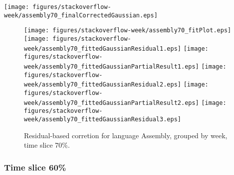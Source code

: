 \begin{center}
{\texttt{[image: figures/stackoverflow-week/assembly70\_finalCorrectedGaussian.eps]}}
\end{center}

\FloatBarrier

\begin{figure}[t]
\centering
{}
{\texttt{[image: figures/stackoverflow-week/assembly70\_fitPlot.eps]}}
{\texttt{[image: figures/stackoverflow-week/assembly70\_fittedGaussianResidual1.eps]}}
{\texttt{[image: figures/stackoverflow-week/assembly70\_fittedGaussianPartialResult1.eps]}}
{\texttt{[image: figures/stackoverflow-week/assembly70\_fittedGaussianResidual2.eps]}}
{\texttt{[image: figures/stackoverflow-week/assembly70\_fittedGaussianPartialResult2.eps]}}
{\texttt{[image: figures/stackoverflow-week/assembly70\_fittedGaussianResidual3.eps]}}
\caption{Residual-based corretion for language Assembly, grouped by week, time slice 70\%.}
\end{figure}


\FloatBarrier


\subsubsection{Time slice 60\%}

